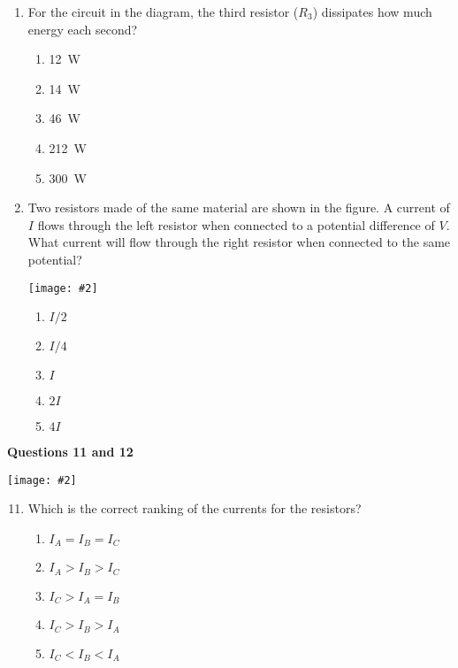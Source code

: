 \documentclass[11pt]{article}
\newcommand{\pic}[2]{\texttt{[image: \#2]}}
\begin{document}
\begin{multicols}{2}
\begin{enumerate}[leftmargin=18pt]
  \item For the circuit in the diagram, the third resistor ($R_3$) dissipates
    how much energy each second?
    \begin{enumerate}[noitemsep,topsep=0pt,leftmargin=18pt,label=(\Alph*)]
    \item\SI{12}{W}
    \item\SI{14}{W}
    \item\SI{46}{W}
    \item\SI{212}{W}
    \item\SI{300}{W}
    \end{enumerate}

    \columnbreak
    
  \item Two resistors made of the same material are shown in the figure. A
    current of $I$ flows through the left resistor when connected to a
    potential difference of $V$. What current will flow through the right
    resistor when connected to the same potential?

    \vspace{-.2in}
    \begin{center}
      \pic{.45}{resistors.png}
    \end{center}
    \begin{enumerate}[noitemsep,topsep=0pt,leftmargin=18pt,label=(\Alph*)]
    \item $I/2$
    \item $I/4$
    \item $I$
    \item $2I$
    \item $4I$
    \end{enumerate}
  \end{enumerate}

  \textbf{Questions 11 and 12}
  
  \begin{center}
    \pic{.45}{resistors-series.png}
  \end{center}
  
  \begin{enumerate}[leftmargin=18pt]
    \setcounter{enumi}{10}
  \item Which is the correct ranking of the currents for the resistors?
    \begin{enumerate}[noitemsep,topsep=0pt,leftmargin=18pt,label=(\Alph*)]
    \item$I_A = I_B = I_C$
    \item$I_A > I_B > I_C$
    \item$I_C > I_A = I_B$
    \item$I_C > I_B > I_A$
    \item$I_C < I_B < I_A$
    \end{enumerate}


\end{enumerate}
\end{multicols}
\end{document}
